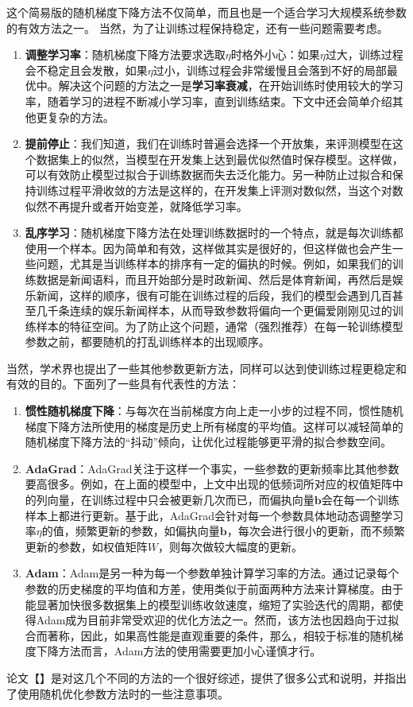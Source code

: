 \documentclass[10pt,a4paper]{ctexart}
\begin{document}
这个简易版的随机梯度下降方法不仅简单，而且也是一个适合学习大规模系统参数的有效方法之一。
当然，为了让训练过程保持稳定，还有一些问题需要考虑。
\begin{enumerate}
\item[] \textbf{调整学习率}：随机梯度下降方法要求选取$\eta$时格外小心：如果$\eta$过大，训练过程会不稳定且会发散，如果$\eta$过小，训练过程会非常缓慢且会落到不好的局部最优中。解决这个问题的方法之一是\textbf{学习率衰减}，在开始训练时使用较大的学习率，随着学习的进程不断减小学习率，直到训练结束。下文中还会简单介绍其他更复杂的方法。
\item[] \textbf{提前停止}：我们知道，我们在训练时普遍会选择一个开放集，来评测模型在这个数据集上的似然，当模型在开发集上达到最优似然值时保存模型。这样做，可以有效防止模型过拟合于训练数据而失去泛化能力。另一种防止过拟合和保持训练过程平滑收敛的方法是这样的，在开发集上评测对数似然，当这个对数似然不再提升或者开始变差，就降低学习率。
\item[] \textbf{乱序学习}：随机梯度下降方法在处理训练数据时的一个特点，就是每次训练都使用一个样本。因为简单和有效，这样做其实是很好的，但这样做也会产生一些问题，尤其是当训练样本的排序有一定的偏执的时候。例如，如果我们的训练数据是新闻语料，而且开始部分是时政新闻、然后是体育新闻，再然后是娱乐新闻，这样的顺序，很有可能在训练过程的后段，我们的模型会遇到几百甚至几千条连续的娱乐新闻样本，从而导致参数将偏向一个更偏爱刚刚见过的训练样本的特征空间。为了防止这个问题，通常（强烈推荐）在每一轮训练模型参数之前，都要随机的打乱训练样本的出现顺序。
\end{enumerate}

当然，学术界也提出了一些其他参数更新方法，同样可以达到使训练过程更稳定和有效的目的。下面列了一些具有代表性的方法：
\begin{enumerate}
\item[] \textbf{惯性随机梯度下降}：与每次在当前梯度方向上走一小步的过程不同，惯性随机梯度下降方法所使用的梯度是历史上所有梯度的平均值。这样可以减轻简单的随机梯度下降方法的“抖动”倾向，让优化过程能够更平滑的拟合参数空间。
\item[] \textbf{AdaGrad}：AdaGrad关注于这样一个事实，一些参数的更新频率比其他参数要高很多。例如，在上面的模型中，上文中出现的低频词所对应的权值矩阵中的列向量，在训练过程中只会被更新几次而已，而偏执向量$\textbf{b}$会在每一个训练样本上都进行更新。基于此，AdaGrad会针对每一个参数具体地动态调整学习率$\eta$的值，频繁更新的参数，如偏执向量$\textbf{b}$，每次会进行很小的更新，而不频繁更新的参数，如权值矩阵$W$，则每次做较大幅度的更新。
\item[] \textbf{Adam}：Adam是另一种为每一个参数单独计算学习率的方法。通过记录每个参数的历史梯度的平均值和方差，使用类似于前面两种方法来计算梯度。由于能显著加快很多数据集上的模型训练收敛速度，缩短了实验迭代的周期，都使得Adam成为目前非常受欢迎的优化方法之一。然而，该方法也因趋向于过拟合而著称，因此，如果高性能是直观重要的条件，那么，相较于标准的随机梯度下降方法而言，Adam方法的使用需要更加小心谨慎才行。
\end{enumerate}
论文【】是对这几个不同的方法的一个很好综述，提供了很多公式和说明，并指出了使用随机优化参数方法时的一些注意事项。
\end{document}
